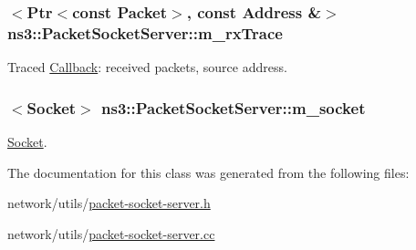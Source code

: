 \subsubsection[{\texorpdfstring{m\+\_\+rx\+Trace}{m_rxTrace}}]{$<${\bf Ptr}$<$const {\bf Packet}$>$, const {\bf Address} \&$>$ ns3\+::\+Packet\+Socket\+Server\+::m\+\_\+rx\+Trace\hspace{0.3cm}{\ttfamily [private]}}\hypertarget{classns3_1_1PacketSocketServer_afb9c702ee314f845b2becc20bf779c09}{}\label{classns3_1_1PacketSocketServer_afb9c702ee314f845b2becc20bf779c09}


Traced \hyperlink{classns3_1_1Callback}{Callback}\+: received packets, source address. 

\subsubsection[{\texorpdfstring{m\+\_\+socket}{m_socket}}]{$<${\bf Socket}$>$ ns3\+::\+Packet\+Socket\+Server\+::m\+\_\+socket\hspace{0.3cm}{\ttfamily [private]}}\hypertarget{classns3_1_1PacketSocketServer_a3a15d1cb5dfa1472a94ab958427c3f3e}{}\label{classns3_1_1PacketSocketServer_a3a15d1cb5dfa1472a94ab958427c3f3e}


\hyperlink{classns3_1_1Socket}{Socket}. 



The documentation for this class was generated from the following files\+:\begin{DoxyCompactItemize}
\item 
network/utils/\hyperlink{packet-socket-server_8h}{packet-\/socket-\/server.\+h}\item 
network/utils/\hyperlink{packet-socket-server_8cc}{packet-\/socket-\/server.\+cc}\end{DoxyCompactItemize}
